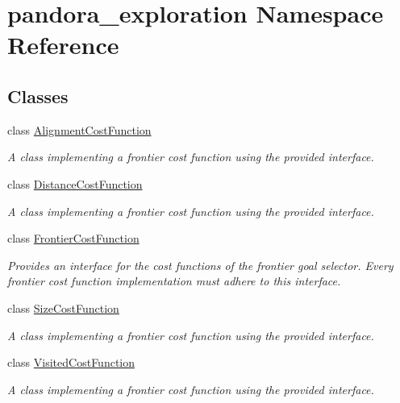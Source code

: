 \hypertarget{namespacepandora__exploration}{\section{pandora\-\_\-exploration \-Namespace \-Reference}
\label{namespacepandora__exploration}
}
\subsection*{\-Classes}
\begin{DoxyCompactItemize}
\item 
class \hyperlink{classpandora__exploration_1_1_alignment_cost_function}{\-Alignment\-Cost\-Function}
\begin{DoxyCompactList}\small\item\em \-A class implementing a frontier cost function using the provided interface. \end{DoxyCompactList}\item 
class \hyperlink{classpandora__exploration_1_1_distance_cost_function}{\-Distance\-Cost\-Function}
\begin{DoxyCompactList}\small\item\em \-A class implementing a frontier cost function using the provided interface. \end{DoxyCompactList}\item 
class \hyperlink{classpandora__exploration_1_1_frontier_cost_function}{\-Frontier\-Cost\-Function}
\begin{DoxyCompactList}\small\item\em \-Provides an interface for the cost functions of the frontier goal selector. \-Every frontier cost function implementation must adhere to this interface. \end{DoxyCompactList}\item 
class \hyperlink{classpandora__exploration_1_1_size_cost_function}{\-Size\-Cost\-Function}
\begin{DoxyCompactList}\small\item\em \-A class implementing a frontier cost function using the provided interface. \end{DoxyCompactList}\item 
class \hyperlink{classpandora__exploration_1_1_visited_cost_function}{\-Visited\-Cost\-Function}
\begin{DoxyCompactList}\small\item\em \-A class implementing a frontier cost function using the provided interface. \end{DoxyCompactList}\item 

\end{DoxyCompactItemize}
